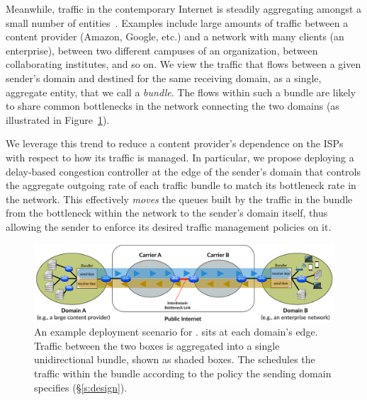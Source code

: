 
Meanwhile, traffic in the contemporary Internet is steadily aggregating amongst a small number of entities~\cite{fivecomps}. 
Examples include large amounts of traffic between a content provider (\eg Amazon, Google, etc.) and a network with many clients (\eg an enterprise), between two different campuses of an organization, between collaborating institutes, and so on.
We view the traffic that flows between a given sender's domain and destined for the same receiving domain, as a single, aggregate entity, that we call a \emph{bundle}.
The flows within such a bundle are likely to share common bottlenecks in the network connecting the two domains (as illustrated in Figure~\ref{fig:deploy:arch}). %

We leverage this trend to reduce a content provider's dependence on the ISPs with respect to how its traffic is managed. In particular, we propose deploying a delay-based congestion controller at the edge of the sender's domain that controls the aggregate outgoing rate of each traffic bundle to match its bottleneck rate in the network. This effectively \emph{moves} the queues built by the traffic in the bundle from the bottleneck within the network to the sender’s domain itself, thus allowing the sender to enforce its desired traffic management policies on it. 






\begin{figure}[t]
    \centering
    \includegraphics[width=\textwidth]{img/deployment-arch.pdf}
    \caption{An example deployment scenario for \name. 
    \name sits at each domain's edge. Traffic between the two boxes is aggregated into a single unidirectional bundle, shown as shaded boxes. The \inbox schedules the traffic within the bundle according to the policy the sending domain specifies (\S\ref{s:design}).
    }
    \label{fig:deploy:arch}
\end{figure}

